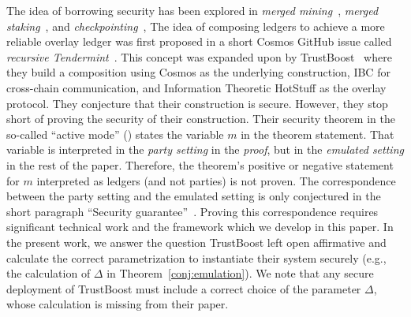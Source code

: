 The idea of borrowing security has been explored in \emph{merged mining}~\cite{namecoin},
\emph{merged staking}~\cite{pos-sidechains}, and
\emph{checkpointing}~\cite{karakostas2021securing},
The idea of composing ledgers to achieve a more reliable overlay ledger
was first proposed in a short Cosmos GitHub issue called
\emph{recursive Tendermint}~\cite{recursive-tendermint}.
This concept was expanded upon by TrustBoost~\cite{trustboost}
where they build a composition using Cosmos as the underlying
construction, IBC for cross-chain communication, and Information Theoretic
HotStuff as the overlay protocol. They conjecture that their construction
is secure. However, they stop short of proving the security of their construction.
Their security theorem in the so-called ``active mode'' (\cite[Theorem 2]{trustboost})
states the variable $m$ in the theorem statement. That variable is
interpreted in the \emph{party setting} in the \emph{proof}, but in the \emph{emulated setting}
in the rest of the paper. Therefore, the theorem's positive or negative statement
for $m$ interpreted as ledgers (and not parties) is not proven.
The correspondence between the party setting and the emulated setting is
only conjectured in the short paragraph ``Security guarantee''~\cite[Section 4.1]{trustboost}.
Proving this correspondence requires significant technical work and the framework
which we develop in this paper.
In the present work, we
answer the question TrustBoost left open affirmative and calculate the correct
parametrization to instantiate their system securely (e.g., the calculation
of $\Delta$ in Theorem~\ref{conj:emulation}). We note that any secure
deployment of TrustBoost must include a correct choice of the parameter $\Delta$,
whose calculation is missing from their paper.
